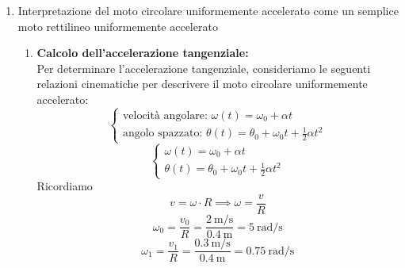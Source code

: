\documentclass{article}
\begin{document}
\begin{enumerate}[label=\arabic*]
    \item Interpretazione del moto circolare uniformemente accelerato come un semplice moto rettilineo uniformemente accelerato
          \begin{enumerate}[label=\alph*)]
              \item \textbf{Calcolo dell'accelerazione tangenziale:} \\
                    Per determinare l'accelerazione tangenziale, consideriamo le seguenti relazioni cinematiche per descrivere il moto circolare uniformemente accelerato:
                    \begin{equation*}
                        \begin{cases}
                            \text{velocità angolare: } \omega(t) = \omega_0 + \alpha t \\
                            \text{angolo spazzato: } \theta(t) = \theta_0 + \omega_0 t + \frac{1}{2} \alpha t^2
                        \end{cases}
                    \end{equation*}
                    \begin{equation*}
                        \begin{cases}
                            \omega(t) = \omega_0 + \alpha t \\
                            \theta(t) = \theta_0 + \omega_0 t + \frac{1}{2} \alpha t^2
                        \end{cases}
                    \end{equation*}
                    Ricordiamo
                    \begin{equation*}
                        \boxed{v = \omega \cdot R} \implies \boxed{\omega = \frac{v}{R}}
                    \end{equation*}
                    \begin{equation*}
                        \omega_0 = \frac{v_0}{R} = \frac{\SI{2}{\meter\per\second}}{\SI{0.4}{\meter}} = \SI{5}{\radian\per\second}
                    \end{equation*}
                    \begin{equation*}
                        \omega_1 = \frac{v_1}{R} = \frac{\SI{0.3}{\meter\per\second}}{\SI{0.4}{\meter}} = \SI{0.75}{\radian\per\second}
                    \end{equation*}
                    \begin{equation*}

\end{equation*}
\end{enumerate}
\end{enumerate}
\end{document}
